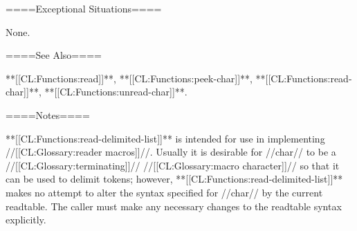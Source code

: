====Exceptional Situations====

None.

====See Also====

**[[CL:Functions:read]]**, **[[CL:Functions:peek-char]]**, **[[CL:Functions:read-char]]**, **[[CL:Functions:unread-char]]**.

====Notes====

**[[CL:Functions:read-delimited-list]]** is intended for use in implementing //[[CL:Glossary:reader macros]]//. Usually it is desirable for //char// to be a //[[CL:Glossary:terminating]]// //[[CL:Glossary:macro character]]// so that it can be used to delimit tokens; however, **[[CL:Functions:read-delimited-list]]** makes no attempt to alter the syntax specified for //char// by the current readtable. The caller must make any necessary changes to the readtable syntax explicitly.

